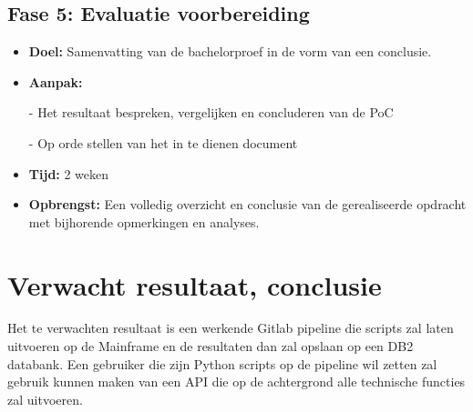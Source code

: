 \subsection{Fase 5: Evaluatie voorbereiding}
\begin{itemize}
    \item \textbf{Doel:}
    Samenvatting van de bachelorproef in de vorm van een conclusie.
    \item \textbf{Aanpak:}
    \item[-] Het resultaat bespreken, vergelijken en concluderen van de PoC
    \item[-] Op orde stellen van het in te dienen document
    
    \item \textbf{Tijd:} 2 weken
    \item \textbf{Opbrengst:}
    Een volledig overzicht en conclusie van de gerealiseerde opdracht met bijhorende opmerkingen en analyses. 
\end{itemize}


\section{Verwacht resultaat, conclusie}%
\label{sec:verwachte_resultaten}

Het te verwachten resultaat is een werkende Gitlab pipeline die scripts zal laten uitvoeren op de Mainframe en de resultaten dan zal opslaan op een DB2 databank. Een gebruiker die zijn Python scripts op de pipeline wil zetten zal gebruik kunnen maken van een API die op de achtergrond alle technische functies zal uitvoeren. 

